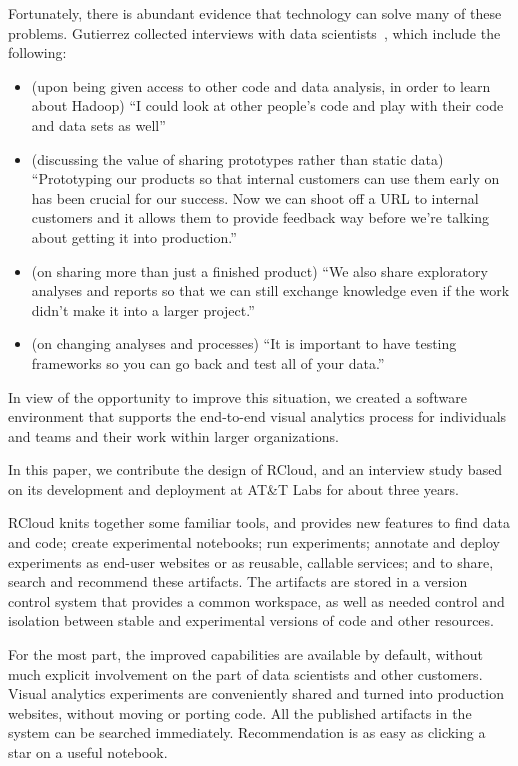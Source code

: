 Fortunately, there is abundant evidence that technology can
solve many of these problems.
Gutierrez collected interviews with data scientists~\cite{Gutierrez:2014:DSA},
which include the following:

\begin{itemize}
\item (upon being given access to other code and data analysis, in
order to learn about Hadoop) ``I could look at other people’s code
and play with their code and data sets as well''
\item (discussing the value of sharing prototypes rather than static
data) ``Prototyping our products so that internal
customers can use them early on has been crucial for
our success. Now we can shoot off a URL to internal
customers and it allows them to provide feedback way before
we're talking about getting it into production.''
\item (on sharing more than just a finished product) ``We also share
exploratory analyses and reports so that we can still exchange
knowledge even if the work didn't make it into a larger project.''
\item (on changing analyses and processes) ``It is important to
have testing frameworks so you can go back and test all
of your data.''
\end{itemize}

In view of the opportunity to improve this situation,
we created a software environment that supports the end-to-end
visual analytics process for individuals and teams and
their work within larger organizations.

In this paper, we contribute the design of RCloud, and an
interview study based on its development and deployment
at AT\&T Labs for about three years.

RCloud knits together some familiar tools, and 
provides new features to find data and code; create experimental notebooks;
run experiments; annotate and deploy experiments as end-user websites or
as reusable, callable services; and to share, search and recommend these artifacts.
The artifacts are stored in a version
control system that provides a common workspace, as well as needed control
and isolation between stable and experimental versions of code and other
resources. 

For the most part, the improved capabilities are available by default,
without much explicit involvement on the part of
data scientists and other customers. Visual analytics experiments are
conveniently shared and turned into production websites, without moving
or porting code. All the published artifacts in the system can be
searched immediately. Recommendation is as easy as clicking a star
on a useful notebook.

